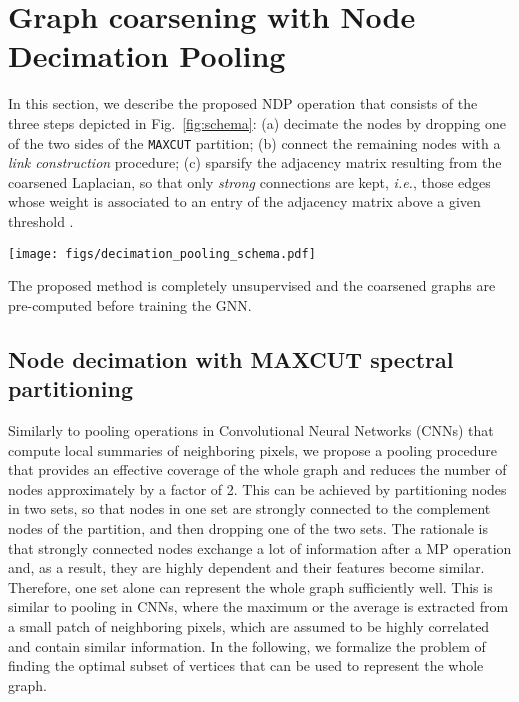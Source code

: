 \documentclass[journal]{IEEEtran}
\newcommand{\maxcut}{\texttt{\small{MAXCUT}}}
\begin{document}
\section{Graph coarsening with Node Decimation Pooling}
\label{sec:method}

In this section, we describe the proposed NDP operation that consists of the three steps depicted in Fig.~\ref{fig:schema}: 
(a) decimate the nodes by dropping one of the two sides of the \maxcut{} partition; 
(b) connect the remaining nodes with a \textit{link construction} procedure; 
(c) sparsify the adjacency matrix resulting from the coarsened Laplacian, so that only \textit{strong} connections are kept, \textit{i.e.}, those edges whose weight is associated to an entry of the adjacency matrix above a given threshold .
\begin{figure*}[!ht]
    \centering
    \texttt{[image: figs/decimation\_pooling\_schema.pdf]}    
    \caption{Depiction of the proposed graph coarsening procedure. 
    First, the nodes are partitioned in two sets according to a \maxcut{} objective and then are decimated by dropping one of the two sets (). Then, a coarsened Laplacian is built by connecting the remaining nodes with a graph reduction procedure. 
    Finally, the edges with low weights in the new adjacency matrix obtained from the coarsened Laplacian are dropped to make the resulting graph sparser.}
    \label{fig:schema}
\end{figure*}
The proposed method is completely unsupervised and the coarsened graphs are pre-computed before training the GNN.


\subsection{Node decimation with MAXCUT spectral partitioning}
\label{sec:maxcut}

Similarly to pooling operations in Convolutional Neural Networks (CNNs) that compute local summaries of neighboring pixels, we propose a pooling procedure that provides an effective coverage of the whole graph and reduces the number of nodes approximately by a factor of 2.
This can be achieved by partitioning nodes in two sets, so that nodes in one set are strongly connected to the complement nodes of the partition, and then dropping one of the two sets.
The rationale is that strongly connected nodes exchange a lot of information after a MP operation and, as a result, they are highly dependent and their features become similar.
Therefore, one set alone can represent the whole graph sufficiently well.
This is similar to pooling in CNNs, where the maximum or the average is extracted from a small patch of neighboring pixels, which are assumed to be highly correlated and contain similar information.
In the following, we formalize the problem of finding the optimal subset of vertices that can be used to represent the whole graph.
\end{document}
